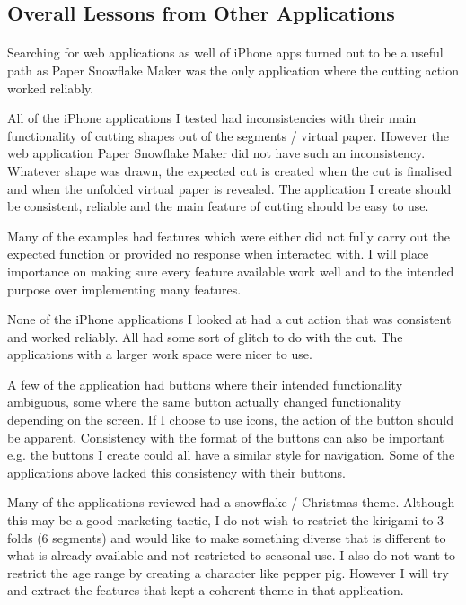 \documentclass[11pt]{article}
\begin{document}
       \subsection{Overall Lessons from Other Applications}
       
            \paragraph{}
            Searching for web applications as well of iPhone apps turned out to be a useful path as Paper Snowflake Maker was the only application where the cutting action worked reliably.
            
            All of the iPhone applications I tested had inconsistencies with their main functionality of cutting shapes out of the segments / virtual paper. However the web application Paper Snowflake Maker did not have such an inconsistency. Whatever shape was drawn, the expected cut is created when the cut is finalised and when the unfolded virtual paper is revealed. The application I create should be consistent, reliable and the main feature of cutting should be easy to use.  
            
            Many of the examples had features which were either did not fully carry out the expected function or provided no response when interacted with. I will place importance on making sure every feature available work well and to the intended purpose over implementing many features. 
            
            None of the iPhone applications I looked at had a cut action that was consistent and worked reliably. All had some sort of glitch to do with the cut. The applications with a larger work space were nicer to use. 
            
            A few of the application had buttons where their intended functionality ambiguous, some where the same button actually changed functionality depending on the screen. If I choose to use icons, the action of the button should be apparent. Consistency with the format of the buttons can also be important e.g. the buttons I create could all have a similar style for navigation. Some of the applications above lacked this consistency with their buttons. 
            
            Many of the applications reviewed had a snowflake / Christmas theme. Although this may be a good marketing tactic, I do not wish to restrict the kirigami to 3 folds (6 segments) and would like to make something diverse that is different to what is already available and not restricted to seasonal use. I also do not want to restrict the age range by creating a character like pepper pig. However I will try and extract the features that kept a coherent theme in that application.
            
\end{document}

